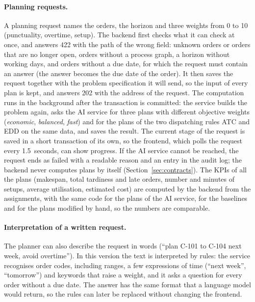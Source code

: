 \paragraph{Planning requests.} A planning request names the orders, the horizon and three
weights from 0 to 10 (punctuality, overtime, setup). The backend first checks what it can check
at once, and answers 422 with the path of the wrong field: unknown orders or orders that are no
longer open, orders without a process graph, a horizon without working days, and orders without
a due date, for which the request must contain an answer (the answer becomes the due date of the
order). It then saves the request together with the problem specification it will send, so the
input of every plan is kept, and answers 202 with the address of the request. The computation
runs in the background after the transaction is committed: the service builds the problem again,
asks the AI service for three plans with different objective weights (\emph{economic},
\emph{balanced}, \emph{fast}) and for the plans of the two dispatching rules ATC and EDD on the
same data, and saves the result. The current stage of the request is saved in a short
transaction of its own, so the frontend, which polls the request every 1.5~seconds, can show
progress. If the AI service cannot be reached, the request ends as failed with a readable reason
and an entry in the audit log; the backend never computes plans by itself
(Section~\ref{sec:contracts}). The KPIs of all the plans (makespan, total tardiness and late
orders, number and minutes of setups, average utilisation, estimated cost) are computed by the
backend from the assignments, with the same code for the plans of the AI service, for the
baselines and for the plans modified by hand, so the numbers are comparable.

\paragraph{Interpretation of a written request.} The planner can also describe the request in
words (``plan C-101 to C-104 next week, avoid overtime''). In this version the text is
interpreted by rules: the service recognises order codes, including ranges, a few expressions
of time (``next week'', ``tomorrow'') and keywords that raise a weight, and it asks a question for
every order without a due date. The answer has the same format that a language model would
return, so the rules can later be replaced without changing the frontend.

